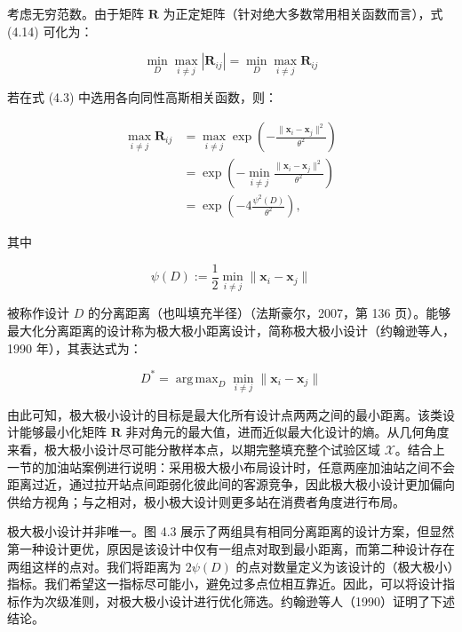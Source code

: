 \documentclass{ctexart}
\DeclareMathOperator*{\argmax}{arg\,max}
\begin{document}
考虑无穷范数。由于矩阵 $\boldsymbol{R}$ 为正定矩阵（针对绝大多数常用相关函数而言），式 (4.14) 可化为：

\begin{equation*}
\min_{D}\max_{i\neq j}|\boldsymbol{R}_{ij}|=\min_{D}\max_{i\neq j}\boldsymbol{R}_{ij}
\tag{4.15}
\end{equation*}

若在式 (4.3) 中选用各向同性高斯相关函数，则：

\begin{align*}
\max_{i\neq j}\boldsymbol{R}_{ij}
&=\max_{i\neq j}\exp\left(-\frac{\|\boldsymbol{x}_i-\boldsymbol{x}_j\|^2}{\theta^2}\right)\\
&=\exp\left(-\min_{i\neq j}\frac{\|\boldsymbol{x}_i-\boldsymbol{x}_j\|^2}{\theta^2}\right)\\
&=\exp\left(-4\frac{\psi^2(D)}{\theta^2}\right),
\end{align*}

其中

\begin{equation*}
\psi(D):=\frac{1}{2}\min_{i\neq j}\|\boldsymbol{x}_i-\boldsymbol{x}_j\|
\end{equation*}

被称作设计 $D$ 的分离距离（也叫填充半径）（法斯豪尔，2007，第 136 页）。能够最大化分离距离的设计称为极大极小距离设计，简称极大极小设计（约翰逊等人，1990 年），其表达式为：

\begin{equation*}
D^*=\argmax_{D}\min_{i\neq j}\|\boldsymbol{x}_i-\boldsymbol{x}_j\|
\tag{4.16}
\end{equation*}

由此可知，极大极小设计的目标是最大化所有设计点两两之间的最小距离。该类设计能够最小化矩阵 $\boldsymbol{R}$ 非对角元的最大值，进而近似最大化设计的熵。从几何角度来看，极大极小设计尽可能分散样本点，以期完整填充整个试验区域 $\mathcal{X}$。结合上一节的加油站案例进行说明：采用极大极小布局设计时，任意两座加油站之间不会距离过近，通过拉开站点间距弱化彼此间的客源竞争，因此极大极小设计更加偏向供给方视角；与之相对，极小极大设计则更多站在消费者角度进行布局。

极大极小设计并非唯一。图 4.3 展示了两组具有相同分离距离的设计方案，但显然第一种设计更优，原因是该设计中仅有一组点对取到最小距离，而第二种设计存在两组这样的点对。我们将距离为 $2\psi(D)$ 的点对数量定义为该设计的（极大极小）指标。我们希望这一指标尽可能小，避免过多点位相互靠近。因此，可以将设计指标作为次级准则，对极大极小设计进行优化筛选。约翰逊等人（1990）证明了下述结论。
\end{document}
